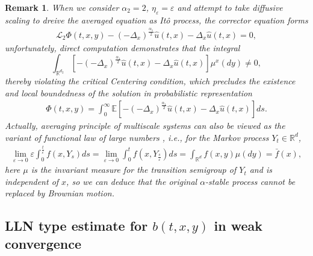 \documentclass[11pt,reqno]{amsart}
\newtheorem{remark}{\indent Remark}[section]
\numberwithin{equation}{section}
\newcommand{\R}{\mathbb{R}}
\newcommand{\al}{\alpha}
\begin{document}
\begin{remark}\label{R61}
When we consider $\alpha_{2}=2$, $\eta_{\varepsilon}=\varepsilon$ and attempt to take diffusive scaling to dreive the averaged equation as It\^{o} process, the corrector equation forms
\begin{equation}\label{6.R1}
	\begin{split}
		\mathcal{L}_{2}\Phi(t,x,y)-(-\Delta_{x})^{\frac{\alpha_{1}}{2}}\hat{u}(t,x)-\Delta_{x}\hat{u}(t,x)=0,
	\end{split}
\end{equation}
 unfortunately, direct computation demonstrates that the integral $$\int_{\mathbb{R}^{ d_{2}}} \left[  -(-\Delta_{x})^{\frac{\alpha_{1}}{2}}\hat{u}(t,x)-\Delta_{x}\hat{u}(t,x)\right]  \mu^{x}(dy)\neq0,$$ thereby violating the critical Centering condition, which precludes the existence and local boundedness of the solution in probabilistic representation
 	\begin{equation}\label{6.R2}
 	\begin{split}
 		\Phi(t,x,y)=\int^{\infty}_{0}\mathbb{E}\left[ -(-\Delta_{x})^{\frac{\alpha_{1}}{2}}\hat{u}(t,x)-\Delta_{x}\hat{u}(t,x)\right]ds.
 	\end{split}
 \end{equation}
 Actually, averaging principle of multiscale systems can also be viewed as the variant of functional law of large numbers \cite{RX2}, i.e., for the Markov process $Y_{t}\in\R^d$,
 \begin{align*}
 	\lim_{\varepsilon\rightarrow0}\varepsilon\int_{0}^{\frac{t}{\varepsilon}}f(x,Y_{s})ds=\lim_{\varepsilon\rightarrow0}\int_{0}^{t}f(x,Y_{\frac{s}{\varepsilon}})ds=\int_{\R^d} f(x,y)\mu(dy)=\bar{f}(x),
 \end{align*}
 here $\mu$ is the invariant measure for the transition
 semigroup of $Y_{t}$ and is independent of $x$, so we can deduce that the original $\al$-stable process cannot be replaced by Brownian motion.
\end{remark}




\subsection{LLN type estimate for $b(t,x,y)$ in weak convergence}
\end{document}
